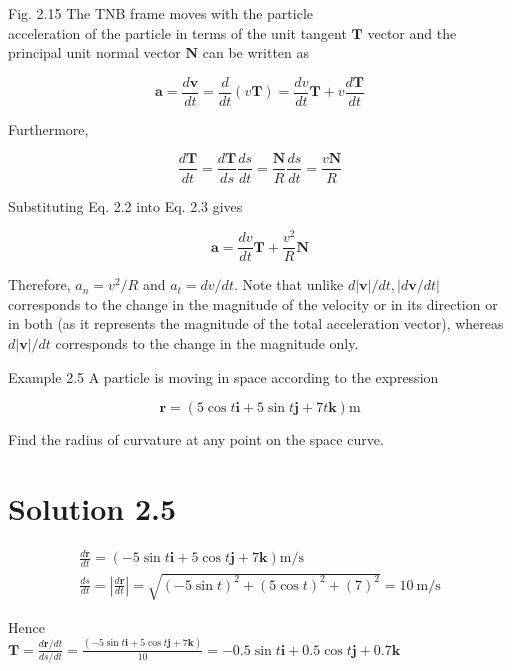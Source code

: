 \documentclass[10pt]{article}
\begin{document}
Fig. 2.15 The TNB frame moves with the particle\\
acceleration of the particle in terms of the unit tangent $\mathbf{T}$ vector and the principal unit normal vector $\mathbf{N}$ can be written as


\begin{equation*}
\mathbf{a}=\frac{d \mathbf{v}}{d t}=\frac{d}{d t}(v \mathbf{T})=\frac{d v}{d t} \mathbf{T}+v \frac{d \mathbf{T}}{d t} \tag{2.2}
\end{equation*}


Furthermore,


\begin{equation*}
\frac{d \mathbf{T}}{d t}=\frac{d \mathbf{T}}{d s} \frac{d s}{d t}=\frac{\mathbf{N}}{R} \frac{d s}{d t}=\frac{v \mathbf{N}}{R} \tag{2.3}
\end{equation*}


Substituting Eq. 2.2 into Eq. 2.3 gives

$$
\mathbf{a}=\frac{d v}{d t} \mathbf{T}+\frac{v^{2}}{R} \mathbf{N}
$$

Therefore, $a_{n}=v^{2} / R$ and $a_{t}=d v / d t$. Note that unlike $d|\mathbf{v}| / d t,|d \mathbf{v} / d t|$ corresponds to the change in the magnitude of the velocity or in its direction or in both (as it represents the magnitude of the total acceleration vector), whereas $d|\mathbf{v}| / d t$ corresponds to the change in the magnitude only.

Example 2.5 A particle is moving in space according to the expression

$$
\mathbf{r}=(5 \cos t \mathbf{i}+5 \sin t \mathbf{j}+7 t \mathbf{k}) \mathrm{m}
$$

Find the radius of curvature at any point on the space curve.

\section*{Solution 2.5}
$$
\begin{gathered}
\frac{d \mathbf{r}}{d t}=(-5 \sin t \mathbf{i}+5 \cos t \mathbf{j}+7 \mathbf{k}) \mathrm{m} / \mathrm{s} \\
\frac{d s}{d t}=\left|\frac{d \mathbf{r}}{d t}\right|=\sqrt{(-5 \sin t)^{2}+(5 \cos t)^{2}+(7)^{2}}=10 \mathrm{~m} / \mathrm{s}
\end{gathered}
$$

Hence\\
$\mathbf{T}=\frac{d \mathbf{r} / d t}{d s / d t}=\frac{(-5 \sin t \mathbf{i}+5 \cos t \mathbf{j}+7 \mathbf{k})}{10}=-0.5 \sin t \mathbf{i}+0.5 \cos t \mathbf{j}+0.7 \mathbf{k}$
\end{document}
